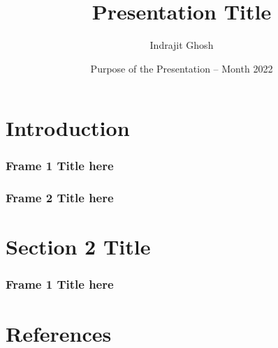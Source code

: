 \documentclass{beamer}
\title{Presentation Title}
\subtitle{}
\author{Indrajit Ghosh}
\institute[ISI] {Indian Statistical Institute Bangalore\\rs\_math1902@isibang.ac.in}
\date[\today]
{Purpose of the Presentation -- Month 2022}
\begin{document}
	
	\frame{\titlepage} %
	\section[Outline]{}
	\frame{\tableofcontents} %


	\section{Introduction}

    \frame
    {
        \frametitle{Frame 1 Title here}
        \lipsum[1]
        \pause
        \lipsum[1]
    }

    \frame
    {
        \frametitle{Frame  2 Title here}
        \lipsum[1-2]
    }


    \section{Section 2 Title}

    \frame
    {
        \frametitle{Frame 1 Title here}
        \lipsum[1]
    }




	\section{References}
\end{document}
